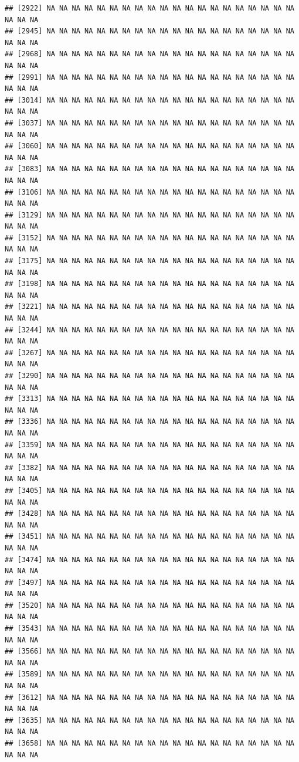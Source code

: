 \documentclass{article}\usepackage[]{graphicx}\usepackage[]{color}
\makeatletter
\newenvironment{kframe}{%
 \def\at@end@of@kframe{}%
 \ifinner\ifhmode%
  \def\at@end@of@kframe{\end{minipage}}%
  \begin{minipage}{\columnwidth}%
 \fi\fi%
 \def\FrameCommand##1{\hskip\@totalleftmargin \hskip-\fboxsep
 \colorbox{shadecolor}{##1}\hskip-\fboxsep
     \hskip-\linewidth \hskip-\@totalleftmargin \hskip\columnwidth}%
 \MakeFramed {\advance\hsize-\width
   \@totalleftmargin\z@ \linewidth\hsize
   \@setminipage}}%
 {\par\unskip\endMakeFramed%
 \at@end@of@kframe}
\newenvironment{knitrout}{}{} %
\makeatother
\begin{document}
\begin{knitrout}
\begin{kframe}
\begin{verbatim}
## [2922] NA NA NA NA NA NA NA NA NA NA NA NA NA NA NA NA NA NA NA NA NA NA NA
## [2945] NA NA NA NA NA NA NA NA NA NA NA NA NA NA NA NA NA NA NA NA NA NA NA
## [2968] NA NA NA NA NA NA NA NA NA NA NA NA NA NA NA NA NA NA NA NA NA NA NA
## [2991] NA NA NA NA NA NA NA NA NA NA NA NA NA NA NA NA NA NA NA NA NA NA NA
## [3014] NA NA NA NA NA NA NA NA NA NA NA NA NA NA NA NA NA NA NA NA NA NA NA
## [3037] NA NA NA NA NA NA NA NA NA NA NA NA NA NA NA NA NA NA NA NA NA NA NA
## [3060] NA NA NA NA NA NA NA NA NA NA NA NA NA NA NA NA NA NA NA NA NA NA NA
## [3083] NA NA NA NA NA NA NA NA NA NA NA NA NA NA NA NA NA NA NA NA NA NA NA
## [3106] NA NA NA NA NA NA NA NA NA NA NA NA NA NA NA NA NA NA NA NA NA NA NA
## [3129] NA NA NA NA NA NA NA NA NA NA NA NA NA NA NA NA NA NA NA NA NA NA NA
## [3152] NA NA NA NA NA NA NA NA NA NA NA NA NA NA NA NA NA NA NA NA NA NA NA
## [3175] NA NA NA NA NA NA NA NA NA NA NA NA NA NA NA NA NA NA NA NA NA NA NA
## [3198] NA NA NA NA NA NA NA NA NA NA NA NA NA NA NA NA NA NA NA NA NA NA NA
## [3221] NA NA NA NA NA NA NA NA NA NA NA NA NA NA NA NA NA NA NA NA NA NA NA
## [3244] NA NA NA NA NA NA NA NA NA NA NA NA NA NA NA NA NA NA NA NA NA NA NA
## [3267] NA NA NA NA NA NA NA NA NA NA NA NA NA NA NA NA NA NA NA NA NA NA NA
## [3290] NA NA NA NA NA NA NA NA NA NA NA NA NA NA NA NA NA NA NA NA NA NA NA
## [3313] NA NA NA NA NA NA NA NA NA NA NA NA NA NA NA NA NA NA NA NA NA NA NA
## [3336] NA NA NA NA NA NA NA NA NA NA NA NA NA NA NA NA NA NA NA NA NA NA NA
## [3359] NA NA NA NA NA NA NA NA NA NA NA NA NA NA NA NA NA NA NA NA NA NA NA
## [3382] NA NA NA NA NA NA NA NA NA NA NA NA NA NA NA NA NA NA NA NA NA NA NA
## [3405] NA NA NA NA NA NA NA NA NA NA NA NA NA NA NA NA NA NA NA NA NA NA NA
## [3428] NA NA NA NA NA NA NA NA NA NA NA NA NA NA NA NA NA NA NA NA NA NA NA
## [3451] NA NA NA NA NA NA NA NA NA NA NA NA NA NA NA NA NA NA NA NA NA NA NA
## [3474] NA NA NA NA NA NA NA NA NA NA NA NA NA NA NA NA NA NA NA NA NA NA NA
## [3497] NA NA NA NA NA NA NA NA NA NA NA NA NA NA NA NA NA NA NA NA NA NA NA
## [3520] NA NA NA NA NA NA NA NA NA NA NA NA NA NA NA NA NA NA NA NA NA NA NA
## [3543] NA NA NA NA NA NA NA NA NA NA NA NA NA NA NA NA NA NA NA NA NA NA NA
## [3566] NA NA NA NA NA NA NA NA NA NA NA NA NA NA NA NA NA NA NA NA NA NA NA
## [3589] NA NA NA NA NA NA NA NA NA NA NA NA NA NA NA NA NA NA NA NA NA NA NA
## [3612] NA NA NA NA NA NA NA NA NA NA NA NA NA NA NA NA NA NA NA NA NA NA NA
## [3635] NA NA NA NA NA NA NA NA NA NA NA NA NA NA NA NA NA NA NA NA NA NA NA
## [3658] NA NA NA NA NA NA NA NA NA NA NA NA NA NA NA NA NA NA NA NA NA NA NA

\end{verbatim}
\end{kframe}
\end{knitrout}
\end{document}
